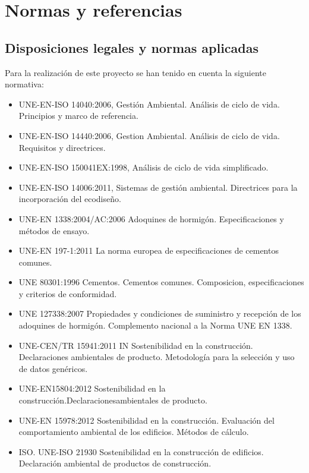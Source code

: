 \chapter{Normas y referencias}
\section{Disposiciones legales y normas aplicadas}

Para la realización de este proyecto se han tenido en cuenta la siguiente normativa:

\begin{itemize}
  \item UNE-EN-ISO 14040:2006, Gestión Ambiental. Análisis de ciclo de vida. Principios y marco de referencia.
  \item UNE-EN-ISO 14440:2006, Gestion Ambiental. Análisis de ciclo de vida. Requisitos y directrices.
  \item UNE-EN-ISO 150041EX:1998, Análisis de ciclo de vida simplificado.
  \item UNE-EN-ISO 14006:2011, Sistemas de gestión ambiental. Directrices para la incorporación del ecodiseño.
  \item UNE-EN 1338:2004/AC:2006 Adoquines de hormigón. Especificaciones y métodos de ensayo.
  \item UNE-EN 197-1:2011 La norma europea de especificaciones de cementos comunes.
  \item UNE 80301:1996 Cementos. Cementos comunes. Composicion, especificaciones y criterios de conformidad.
  \item UNE 127338:2007 Propiedades y condiciones de suministro y recepción de los adoquines de hormigón. Complemento nacional a la Norma UNE EN 1338.
  \item UNE-CEN/TR 15941:2011 IN Sostenibilidad en la construcción. Declaraciones ambientales de producto. Metodología para la selección y uso de datos genéricos.
  \item UNE-EN15804:2012 Sostenibilidad en la construcción.Declaracionesambientales de producto.
  \item UNE-EN 15978:2012 Sostenibilidad en la construcción. Evaluación del comportamiento ambiental de los edificios. Métodos de cálculo.
  \item ISO. UNE-ISO 21930 Sostenibilidad en la construcción de edificios. Declaración ambiental de productos de construcción.
\end{itemize}




